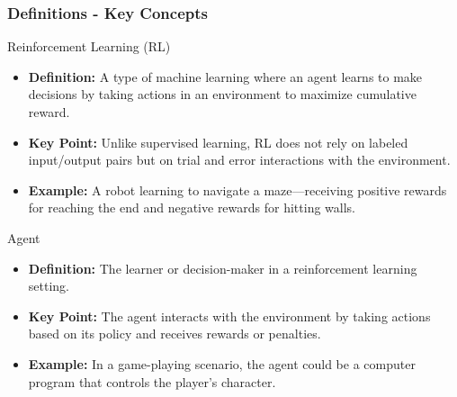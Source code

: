 \documentclass[aspectratio=169]{beamer}
\begin{document}
\begin{frame}[fragile]
    \frametitle{Definitions - Key Concepts}
    \begin{block}{Reinforcement Learning (RL)}
        \begin{itemize}
            \item \textbf{Definition:} A type of machine learning where an agent learns to make decisions by taking actions in an environment to maximize cumulative reward.
            \item \textbf{Key Point:} Unlike supervised learning, RL does not rely on labeled input/output pairs but on trial and error interactions with the environment.
            \item \textbf{Example:} A robot learning to navigate a maze—receiving positive rewards for reaching the end and negative rewards for hitting walls.
        \end{itemize}
    \end{block}

    \begin{block}{Agent}
        \begin{itemize}
            \item \textbf{Definition:} The learner or decision-maker in a reinforcement learning setting.
            \item \textbf{Key Point:} The agent interacts with the environment by taking actions based on its policy and receives rewards or penalties.
            \item \textbf{Example:} In a game-playing scenario, the agent could be a computer program that controls the player’s character.
        \end{itemize}
    \end{block}
\end{frame}
\end{document}
